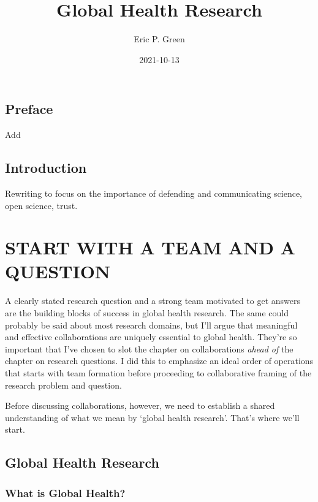 \documentclass[justified,twoside,symmetric,]{tufte-book}
\title{Global Health Research}
\author{Eric P. Green}
\date{2021-10-13}
\begin{document}
\maketitle



{
\setcounter{tocdepth}{1}
\tableofcontents
}

\hypertarget{preface}{%
\chapter*{Preface}\label{preface}}

Add

\hypertarget{introduction}{%
\chapter*{Introduction}\label{introduction}}

Rewriting to focus on the importance of defending and communicating science, open science, trust.

\hypertarget{part-start-with-a-team-and-a-question}{%
\part{START WITH A TEAM AND A QUESTION}\label{part-start-with-a-team-and-a-question}}

A clearly stated research question and a strong team motivated to get answers are the building blocks of success in global health research. The same could probably be said about most research domains, but I'll argue that meaningful and effective collaborations are uniquely essential to global health. They're so important that I've chosen to slot the chapter on collaborations \emph{ahead of} the chapter on research questions. I did this to emphasize an ideal order of operations that starts with team formation before proceeding to collaborative framing of the research problem and question.

Before discussing collaborations, however, we need to establish a shared understanding of what we mean by `global health research'. That's where we'll start.

\hypertarget{ghr}{%
\chapter{Global Health Research}\label{ghr}}

\hypertarget{what-is-global-health}{%
\section{What is Global Health?}\label{what-is-global-health}}
\end{document}
